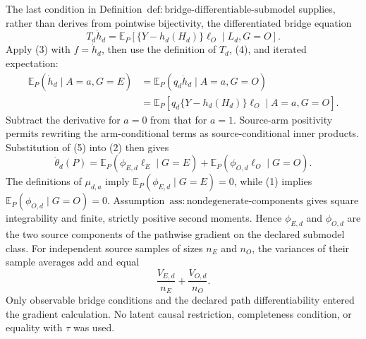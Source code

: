 The last condition in Definition~\(\mathrm{def{:}bridge\text{-}differentiable\text{-}submodel}\) supplies, rather than derives from pointwise bijectivity, the differentiated bridge equation
\[
 T_d\dot h_d
 =\mathbb E_P[\{Y-h_d(H_d)\}\ell_O\mid L_d,G=O].        \tag{4}
\]
Apply (3) with \(f=\dot h_d\), then use the definition of \(T_d\), (4), and iterated expectation:
\[
\begin{aligned}
 \mathbb E_P(\dot h_d\mid A=a,G=E)
 &=\mathbb E_P(q_d\dot h_d\mid A=a,G=O)\\
 &=\mathbb E_P[q_d\{Y-h_d(H_d)\}\ell_O\mid A=a,G=O].   \tag{5}
\end{aligned}
\]
Subtract the derivative for \(a=0\) from that for \(a=1\).  Source-arm positivity permits rewriting the arm-conditional terms as source-conditional inner products.  Substitution of (5) into (2) then gives
\[
 \dot\theta_d(P)
 =\mathbb E_P(\phi_{E,d}\ell_E\mid G=E)
  +\mathbb E_P(\phi_{O,d}\ell_O\mid G=O).               \tag{6}
\]
The definitions of \(\mu_{d,a}\) imply \(\mathbb E_P(\phi_{E,d}\mid G=E)=0\), while (1) implies \(\mathbb E_P(\phi_{O,d}\mid G=O)=0\).  Assumption~\(\mathrm{ass{:}nondegenerate\text{-}components}\) gives square integrability and finite, strictly positive second moments.  Hence \(\phi_{E,d}\) and \(\phi_{O,d}\) are the two source components of the pathwise gradient on the declared submodel class.  For independent source samples of sizes \(n_E\) and \(n_O\), the variances of their sample averages add and equal
\[
 \frac{V_{E,d}}{n_E}+\frac{V_{O,d}}{n_O}.
\]
Only observable bridge conditions and the declared path differentiability entered the gradient calculation.  No latent causal restriction, completeness condition, or equality with \(\tau\) was used.